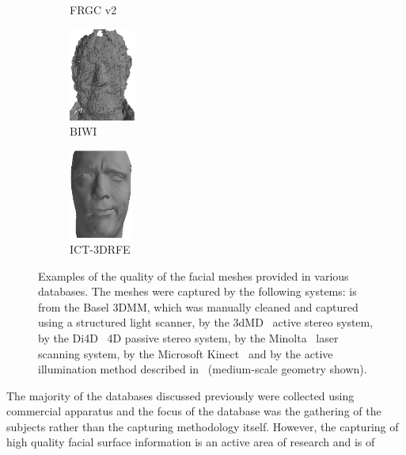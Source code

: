 \begin{figure}[ht]
\begin{subfigure}[b]{0.3\textwidth}
		\caption{FRGC v2~\cite{phillips2005overview}}\label{fig:db_examples_frgc}
	\end{subfigure}
	\begin{subfigure}[b]{0.3\textwidth}
		\centering
		\includegraphics[height=1.2in]{background/images/biwi}
		\caption{BIWI~\cite{fanelli2013random}}\label{fig:db_examples_biwi}
	\end{subfigure}
	\begin{subfigure}[b]{0.32\textwidth}
		\centering
		\includegraphics[height=1.15in]{background/images/ict}
		\caption{ICT-3DRFE~\cite{stratou2012exploring}}\label{fig:db_examples_ict}
	\end{subfigure}
	\caption{Examples of the quality of the facial meshes provided in various
	         databases. The meshes were captured by the following systems:
	          is from the Basel 3DMM,
	         which was manually cleaned and captured using a structured light
	         scanner,  by the
	         3dMD~\cite{3dmd} active stereo system,
	          by the
	         Di4D~\cite{di4d} 4D passive stereo system,
	          by the
	         Minolta~\cite{minolta} laser scanning system,
	          by the
	         Microsoft Kinect~\cite{zhang2012microsoft} and
	          by the active illumination method
	         described in~\cite{debevec2000acquiring}
	         (medium-scale geometry shown).}
\label{fig:db_examples}
\end{figure}
The majority of the databases discussed previously were collected using
commercial apparatus and the focus of the database was the gathering of the
subjects rather than the capturing methodology itself. However, the capturing of
high quality facial surface information is an active area of research and is of
